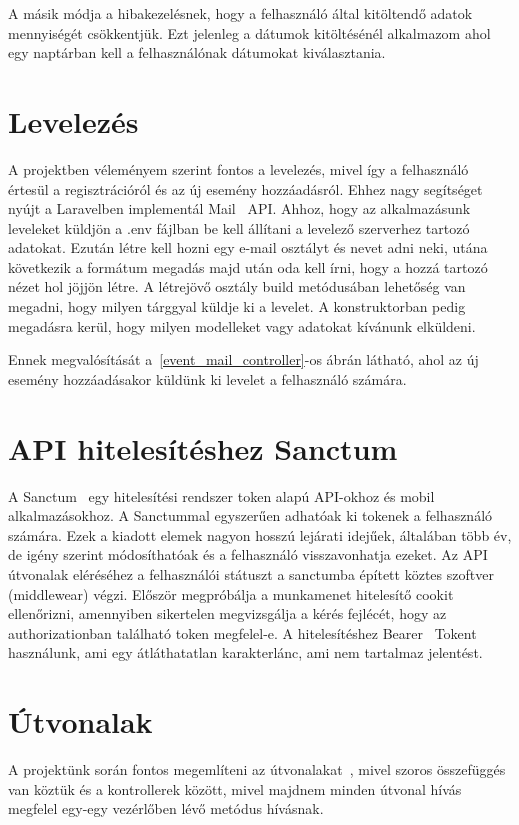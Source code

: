 \documentclass[
]{thesis-ekf}
\theoremstyle{definition}
\theoremstyle{remark}
\begin{document}
	A másik módja a hibakezelésnek, hogy a felhasználó által kitöltendő adatok mennyiségét csökkentjük. Ezt jelenleg a dátumok kitöltésénél alkalmazom ahol egy naptárban kell a felhasználónak dátumokat kiválasztania. 
	
	\section{Levelezés}
	A projektben véleményem szerint fontos a levelezés, mivel így a felhasználó értesül a regisztrációról és az új esemény hozzáadásról. Ehhez nagy segítséget nyújt a Laravelben implementál Mail~\cite{laravel_mail} API. Ahhoz, hogy az alkalmazásunk leveleket küldjön a .env fájlban be kell állítani a levelező szerverhez tartozó adatokat. Ezután létre kell hozni egy e-mail osztályt és nevet adni neki, utána következik a formátum megadás majd után oda kell írni, hogy a hozzá tartozó nézet hol jöjjön létre. A létrejövő osztály build metódusában lehetőség van megadni, hogy milyen tárggyal küldje ki a levelet. A konstruktorban pedig megadásra kerül, hogy milyen modelleket vagy adatokat kívánunk elküldeni.
	
	Ennek megvalósítását a~\ref{event_mail_controller}-os ábrán látható, ahol az új esemény hozzáadásakor küldünk ki levelet a felhasználó számára.
	
	
	
	\section{API hitelesítéshez Sanctum}
	A Sanctum~\cite{laravel_sanctum} egy hitelesítési rendszer token alapú API-okhoz és mobil alkalmazásokhoz. A Sanctummal egyszerűen adhatóak ki tokenek a felhasználó számára. Ezek a kiadott elemek nagyon hosszú lejárati idejűek, általában több év, de igény szerint módosíthatóak és a felhasználó visszavonhatja ezeket. Az API útvonalak eléréséhez a felhasználói státuszt a sanctumba épített köztes szoftver (middlewear) végzi. Először megpróbálja a munkamenet hitelesítő cookit ellenőrizni, amennyiben sikertelen megvizsgálja a kérés fejlécét, hogy az authorizationban található token megfelel-e. A hitelesítéshez Bearer~\cite{bearer_token} Tokent használunk, ami egy átláthatatlan karakterlánc, ami nem tartalmaz jelentést.
	
	\section{Útvonalak}
	A projektünk során fontos megemlíteni az útvonalakat~\cite{laravel_route}, mivel szoros összefüggés van köztük és a kontrollerek között, mivel majdnem minden útvonal hívás megfelel egy-egy vezérlőben lévő metódus hívásnak. 
	
\end{document}

